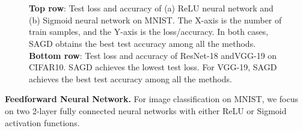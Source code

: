 \documentclass[11pt]{article}
\begin{document}
\begin{figure}[t]
\mbox{
\hspace{-0.1in}
 }


 \mbox{
\hspace{-0.1in}
 }
 \caption[]{ \textbf{Top row}: Test loss and accuracy of (a) ReLU neural network and (b) Sigmoid neural network on MNIST. The X-axis is the number of train samples, and the Y-axis is the loss/accuracy. In both cases, \textsc{SAGD} obtains the best test accuracy among all the methods.
\textbf{Bottom row}: Test loss and accuracy of ResNet-18 andVGG-19 on CIFAR10. \textsc{SAGD} achieves the lowest test loss. For VGG-19, \textsc{SAGD} achieves the best test accuracy among all the methods. } 
 \label{fig:mnist}
\end{figure}
\textbf{Feedforward Neural Network.}
For image classification on MNIST, we focus on two 2-layer fully connected neural networks with either ReLU or Sigmoid activation functions. 
\end{document}
